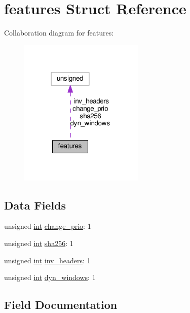 \hypertarget{structfeatures}{}\section{features Struct Reference}
\label{structfeatures}


Collaboration diagram for features\+:
\nopagebreak
\begin{figure}[H]
\begin{center}
\leavevmode
\includegraphics[width=168pt]{structfeatures__coll__graph}
\end{center}
\end{figure}
\subsection*{Data Fields}
\begin{DoxyCompactItemize}
\item 
unsigned \hyperlink{pcre_8txt_a42dfa4ff673c82d8efe7144098fbc198}{int} \hyperlink{structfeatures_a015dad6bc7c9733d24c772f73236cc57}{change\+\_\+prio}\+: 1
\item 
unsigned \hyperlink{pcre_8txt_a42dfa4ff673c82d8efe7144098fbc198}{int} \hyperlink{structfeatures_afb5622b086ce261146405e97aed13595}{sha256}\+: 1
\item 
unsigned \hyperlink{pcre_8txt_a42dfa4ff673c82d8efe7144098fbc198}{int} \hyperlink{structfeatures_abcbcbe82e6f04bc9c739e453219e4155}{inv\+\_\+headers}\+: 1
\item 
unsigned \hyperlink{pcre_8txt_a42dfa4ff673c82d8efe7144098fbc198}{int} \hyperlink{structfeatures_a13aaf8ff9a041e9eb5697d5260fd9ffb}{dyn\+\_\+windows}\+: 1
\end{DoxyCompactItemize}


\subsection{Field Documentation}

